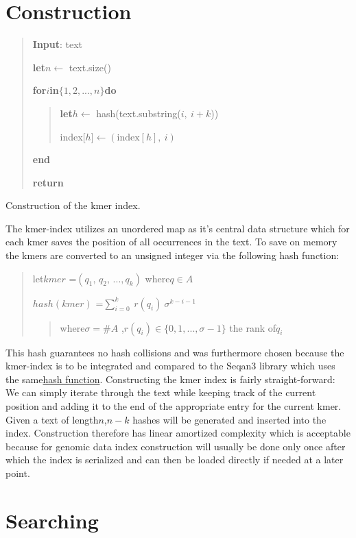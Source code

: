 \section{Construction}

\begin{algorithm}[H]
\begin{verse}
\textbf{Input}: text

\textbf{let}$n$$\leftarrow$ text.size()

\textbf{for}$i$\textbf{in}$\{1,2,...,n\}$\textbf{do}
\begin{verse}
\textbf{let}$h$$\leftarrow$ hash(text.substring($i,\:i+k$))

index{[}$h${]}$\leftarrow$$(\text{index}[h],\:i)$
\end{verse}
\textbf{end}

\textbf{return}
\end{verse}
\caption{Construction of the kmer index.}
\end{algorithm}

The kmer-index utilizes an unordered map as it's central data structure
which for each kmer saves the position of all occurrences in the text.
To save on memory the kmers are converted to an unsigned integer via
the following hash function:
\begin{verse}
let$kmer$ =$(q_{1},\,q_{2},\,...,q_{k})$ where$q\in A$

$hash(kmer)$ =$\sum_{i=0}^{k}\:r(q_{i})\:\sigma^{k-i-1}$
\begin{verse}
where$\sigma=\#A$ ,$r(q_{i})\in\{0,1,...,\sigma-1\}$ the rank of$q_{i}$
\end{verse}
\end{verse}
This hash guarantees no hash collisions and was furthermore chosen
because the kmer-index is to be integrated and compared to the Seqan3
library which uses the same\href{http://docs.seqan.de/seqan/3-master-user/group__views.html\#ga6e598d6a021868f704d39df73252974f}{hash function}.
Constructing the kmer index is fairly straight-forward: We can simply
iterate through the text while keeping track of the current position
and adding it to the end of the appropriate entry for the current
kmer. Given a text of length$n$,$n-k$ hashes will be generated and
inserted into the index. Construction therefore has linear amortized
complexity which is acceptable because for genomic data index construction
will usually be done only once after which the index is serialized
and can then be loaded directly if needed at a later point.

\section{Searching}

